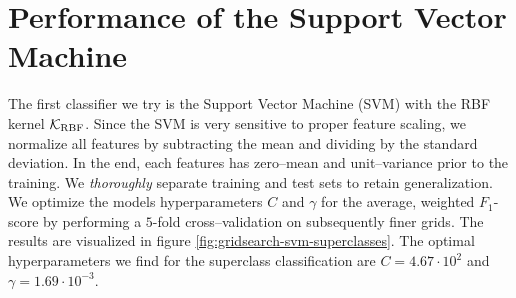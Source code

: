 
\section{Performance of the Support Vector Machine}

The first classifier we try is the Support Vector Machine (SVM) with the RBF kernel $\mathcal{K}_{\text{RBF}}$. Since the SVM is very sensitive to proper feature scaling, we normalize all features by subtracting the mean and dividing by the standard deviation. In the end, each features has zero--mean and unit--variance prior to the training. We \emph{thoroughly} separate training and test sets to retain generalization. We optimize the models hyperparameters $C$ and $\gamma$ for the average, weighted $F_1$-score by performing a $5$-fold cross--validation on subsequently finer grids. The results are visualized in figure \ref{fig:gridsearch-svm-superclasses}. The optimal hyperparameters we find for the superclass classification are $C = 4.67 \cdot 10^{2}$ and $\gamma = 1.69 \cdot 10^{-3}$.\\

